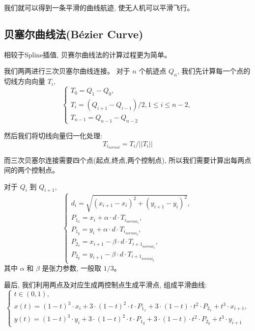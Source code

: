 \documentclass[12pt,a4paper,oneside,UTF8]{ctexart}
\begin{document}
我们就可以得到一条平滑的曲线航迹,
使无人机可以平滑飞行。

\subsection{贝塞尔曲线法(Bézier Curve)}
相较于Spline插值,
贝赛尔曲线法的计算过程更为简单。

我们两两进行三次贝塞尔曲线连接。
对于 $n$ 个航迹点 $Q_n$,
我们先计算每一个点的切线方向向量 $T_i$,
\begin{equation}
  \begin{cases}
    T_0 = Q_1 - Q_0 ,\\
    T_i = (Q_{i+1}-Q_{i-1})/2 , 1 \leq i \leq n-2 ,\\
    T_{n-1} = Q_{n-1} - Q_{n-2}
  \end{cases}
  \nonumber
\end{equation}

然后我们将切线向量归一化处理:
\[ T_{i_{normal}} = T_i / \lvert {\lvert T_i \rvert}\rvert \]

而三次贝塞尔连接需要四个点(起点,终点,两个控制点),
所以我们需要计算出每两点间的两个控制点。

对于 $Q_i$ 到 $Q_{i+1}$,
\begin{equation}
  \begin{cases}
    d_i=\sqrt{(x_{i+1}-x_i)^2 + (y_{i+1}-y_i)^2} ,\\
    P_{1_x} = x_i + \alpha \cdot d\cdot T_{i_{{normal}_x}} ,\\
    P_{1_y} = y_i + \alpha \cdot d\cdot T_{i_{{normal}_y}} ,\\
    P_{2_x} = x_{i+1} - \beta \cdot d\cdot T_{{i+1}_{{normal}_x}} ,\\
    P_{2_y} = y_{i+1} - \beta \cdot d\cdot T_{{i+1}_{{normal}_y}}
  \end{cases}
  \nonumber
\end{equation}
其中 $\alpha$ 和 $\beta$ 是张力参数,
一般取 $1/3$。

最后,
我们利用两点及对应生成两控制点生成平滑点,
组成平滑曲线:
\begin{equation}
  \begin{cases}
    t \in (0,1) ,\\
    x(t) = (1-t)^3\cdot x_i + 3\cdot (1-t)^2\cdot t\cdot P_{1_x} + 3\cdot(1-t)\cdot t^2\cdot P_{2_x}+t^3\cdot x_{i+1} ,\\
    y(t) = (1-t)^3\cdot y_i + 3\cdot (1-t)^2\cdot t\cdot P_{1_y} + 3\cdot(1-t)\cdot t^2\cdot P_{2_y}+t^3\cdot y_{i+1}
  \end{cases}
  \nonumber
\end{equation}
\end{document}

